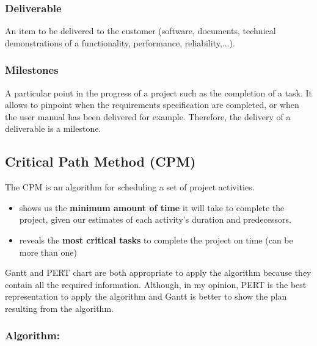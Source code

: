 \subsubsection{Deliverable}
An item to be delivered to the customer (software, documents, technical demonstrations of a functionality, performance, reliability,...).

\subsubsection{Milestones}
A particular point in the progress of a project such as the completion of a task. It allows to pinpoint when the requirements specification are completed, or when the user manual has been delivered for example. Therefore, the delivery of a deliverable is a milestone.


\subsection{Critical Path Method (CPM)}

The CPM is an algorithm for scheduling a set of project activities.
\begin{itemize}
    \item shows us the \textbf{minimum amount of time} it will take to
        complete the project, given our estimates of each activity’s duration
        and predecessors.
    \item reveals the \textbf{most critical tasks} to complete
        the project on time (can be more than one)
\end{itemize}


Gantt and PERT chart are both appropriate to apply the algorithm because they contain all the
required information. Although, in my opinion, PERT is the best representation to apply the
algorithm and Gantt is better to show the plan resulting from the algorithm.

\subsubsection{Algorithm:}

